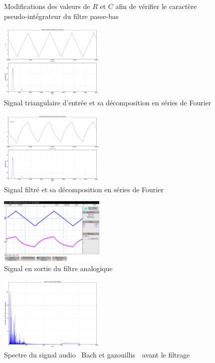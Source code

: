 \documentclass[a4paper]{article}
\begin{document}
\begin{multicols}
\begin{figure}[H]
	\caption{Modifications des valeurs de $R$\/ et $C$\/ afin de vérifier le caractère pseudo-intégrateur du filtre passe-bas}
\end{figure}

\begin{figure}[H]
	\centering
	\includegraphics[width=0.45\textwidth]{figures/Capture16.png}
	\caption{Signal triangulaire d'entrée et sa décomposition en séries de {\sc Fourier}\/}
\end{figure}

\begin{figure}[H]
	\centering
	\includegraphics[width=0.45\textwidth]{figures/Capture17.png}
	\caption{Signal filtré et sa décomposition en séries de {\sc Fourier}\/}
\end{figure}

\begin{figure}[H]
	\centering
	\includegraphics[width=0.45\textwidth]{figures/scope_30.png}
	\caption{Signal en sortie du filtre analogique}
\end{figure}

\begin{figure}[H]
	\centering
	\includegraphics[width=0.45\textwidth]{figures/Capture18.png}
	\caption{Spectre du signal audio \guillemotleft~{\sc Bach} et gazouillis~\guillemotright\ avant le filtrage}
\end{figure}


\end{multicols}
\end{document}
